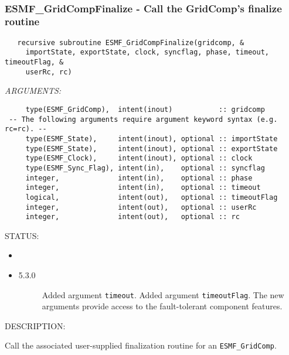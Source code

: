  
\mbox{}\hrulefill\ 
 
\subsubsection [ESMF\_GridCompFinalize] {ESMF\_GridCompFinalize - Call the GridComp's finalize routine}


  
\begin{verbatim}   recursive subroutine ESMF_GridCompFinalize(gridcomp, &
     importState, exportState, clock, syncflag, phase, timeout, timeoutFlag, &
     userRc, rc)\end{verbatim}{\em ARGUMENTS:}
\begin{verbatim}     type(ESMF_GridComp),  intent(inout)           :: gridcomp
 -- The following arguments require argument keyword syntax (e.g. rc=rc). --
     type(ESMF_State),     intent(inout), optional :: importState
     type(ESMF_State),     intent(inout), optional :: exportState
     type(ESMF_Clock),     intent(inout), optional :: clock
     type(ESMF_Sync_Flag), intent(in),    optional :: syncflag
     integer,              intent(in),    optional :: phase
     integer,              intent(in),    optional :: timeout
     logical,              intent(out),   optional :: timeoutFlag
     integer,              intent(out),   optional :: userRc
     integer,              intent(out),   optional :: rc\end{verbatim}
{\sf STATUS:}
   \begin{itemize}
   \item{}
   \item{}
   \begin{description}
   \item[5.3.0] Added argument {\tt timeout}.
                Added argument {\tt timeoutFlag}.
                The new arguments provide access to the fault-tolerant component
                features.
   \end{description}
   \end{itemize}
  
{\sf DESCRIPTION:\\ }


   Call the associated user-supplied finalization routine for
   an {\tt ESMF\_GridComp}.
  

